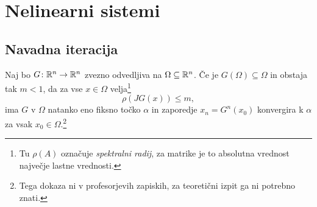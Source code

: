 \section{Nelinearni sistemi}

\subsection{Navadna iteracija}

\begin{izrek}
Naj bo $G \colon \mathbb{R}^n \to \mathbb{R}^n$ zvezno odvedljiva na
$\Omega \subseteq \mathbb{R}^n$. Če je $G(\Omega) \subseteq \Omega$ in
obstaja tak $m < 1$, da za vse $x \in \Omega$
velja\footnote{Tu $\rho(A)$ označuje \emph{spektralni radij}, za
matrike je to absolutna vrednost največje lastne vrednosti.}
\[
\rho(JG(x)) \leq m,
\]
ima $G$ v $\Omega$ natanko eno fiksno točko $\alpha$ in zaporedje
$x_n = G^n(x_0)$ konvergira k $\alpha$ za vsak
$x_0 \in \Omega$.\footnote{Tega dokaza ni v profesorjevih zapiskih,
za teoretični izpit ga ni potrebno znati.}
\end{izrek}

